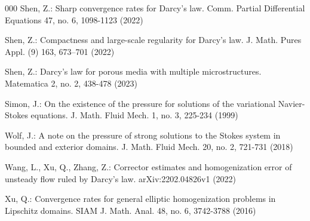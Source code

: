\documentclass[13pt,CJK]{article}
\theoremstyle{plain}                       %
\theoremstyle{remark}
\numberwithin{equation}{section}
\begin{document}
\begin{thebibliography}{000}
Shen, Z.: Sharp convergence rates for Darcy's law.
Comm. Partial Differential Equations 47, no. 6, 1098-1123 (2022)

Shen, Z.: Compactness and large-scale regularity for Darcy's law. J. Math. Pures Appl. (9) 163, 673–701 (2022)

Shen, Z.: Darcy's law for porous media with multiple microstructures. Matematica 2, no. 2, 438-478 (2023)



Simon, J.:
 On the existence of the pressure for solutions of the variational Navier-Stokes equations. J. Math. Fluid Mech. 1, no. 3, 225-234
(1999)




Wolf, J.: A note on the pressure of strong solutions to the Stokes system in bounded and exterior domains.
J. Math. Fluid Mech. 20, no. 2, 721-731
(2018)

Wang, L., Xu, Q., Zhang, Z.:
Corrector estimates and homogenization error of unsteady flow ruled by Darcy's law. arXiv:2202.04826v1 (2022)

Xu, Q.:
Convergence rates for general elliptic homogenization problems in Lipschitz domains. SIAM J. Math. Anal. 48, no. 6, 3742-3788
(2016)


\end{thebibliography}
\end{document}
